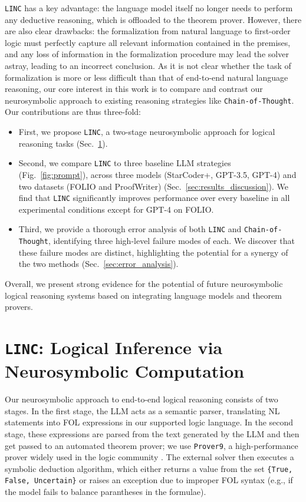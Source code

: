 \documentclass[11pt]{article}
\begin{document}
\texttt{LINC} has a key advantage: the language model itself no longer needs to perform any deductive reasoning, which is offloaded to the theorem prover. However, there are also clear drawbacks: the formalization from natural language to first-order logic must perfectly capture all relevant information contained in the premises, and any loss of information in the formalization procedure may lead the solver astray, leading to an incorrect conclusion.
As it is not clear whether the task of formalization is more or less difficult than that of end-to-end natural language reasoning, our core interest in this work is to compare and contrast our neurosymbolic approach to existing reasoning strategies like \texttt{Chain-of-Thought}. Our contributions are thus three-fold:
\begin{itemize}
\item First, we propose \texttt{LINC}, a two-stage neurosymbolic approach for logical reasoning tasks (Sec.~\ref{sec:ns-model}).

\item Second, we compare \texttt{LINC} to three baseline LLM strategies (Fig.~\ref{fig:prompt}), across three models (StarCoder+, GPT-3.5, GPT-4) and two datasets (FOLIO and ProofWriter) (Sec.~\ref{sec:results_discussion}). We find that \texttt{LINC} significantly improves performance over every baseline in all experimental conditions except for GPT-4 on FOLIO.
\item Third, we provide a thorough error analysis of both \texttt{LINC} and \texttt{Chain-of-Thought}, identifying three high-level failure modes of each. We discover that these failure modes are distinct, highlighting the potential for a synergy of the two methods (Sec.~\ref{sec:error_analysis}).
\end{itemize}
Overall, we present strong evidence for the potential of future neurosymbolic logical reasoning systems based on integrating language models and theorem provers.

\section{\texttt{LINC}: Logical Inference via Neurosymbolic Computation}
\label{sec:ns-model}

Our neurosymbolic approach to end-to-end logical reasoning consists of two stages. In the first stage, the LLM acts as a semantic parser, translating NL statements into FOL expressions in our supported logic language.
In the second stage, these expressions are parsed from the text generated by the LLM and then get passed to an automated theorem prover; we use \texttt{Prover9}, a high-performance prover widely used in the logic community \citep{prover9-mace4}.
The external solver then executes a symbolic deduction algorithm, which either returns a value from the set \texttt{\{True, \texttt{False}, Uncertain\}} or raises an exception due to improper FOL syntax (e.g., if the model fails to balance parantheses in the formulae).
\end{document}
